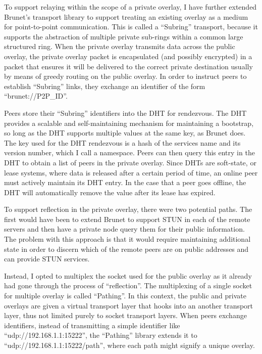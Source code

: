 To support relaying within the scope of a private overlay, I have
further extended Brunet's transport library to support treating an existing
overlay as a medium for point-to-point communication. This is called a
``Subring'' transport, because it supports the abstraction of multiple private
sub-rings within a common large structured ring.  When the private overlay
transmits data across the public overlay, the private overlay packet is
encapsulated (and possibly encrypted) in a packet that ensures it will be
delivered to the correct private destination usually by means of greedy routing
on the public overlay.  In order to instruct peers to establish ``Subring''
links, they exchange an identifier of the form ``brunet://P2P\_ID''.

Peers store their ``Subring'' identifiers into the DHT for rendezvous.
The DHT provides a scalable and self-maintaining mechanism for maintaining a
bootstrap, so long as the DHT supports multiple values at the same key, as
Brunet does.  The key used for the DHT rendezvous is a hash of the services
name and its version number, which I call a namespace.  Peers can then query
this entry in the DHT to obtain a list of peers in the private overlay.  Since
DHTs are soft-state, or lease systems, where data is released after a certain
period of time, an online peer must actively maintain its DHT entry.  In the
case that a peer goes offline, the DHT will automatically remove the value
after its lease has expired.

To support reflection in the private overlay, there were two potential paths.
The first would have been to extend Brunet to support STUN in each of the
remote servers and then have a private node query them for their public
information.  The problem with this approach is that it would require
maintaining additional state in order to discern which of the remote peers are
on public addresses and can provide STUN services.

Instead, I opted to multiplex the socket used for the public overlay as it
already had gone through the process of ``reflection''.  The multiplexing of a
single socket for multiple overlay is called ``Pathing''.  In this context, the
public and private overlays are given a virtual transport layer that hooks into
an another transport layer, thus not limited purely to socket transport layers.
When peers exchange identifiers, instead of transmitting a simple identifier
like ``udp://192.168.1.1:15222'', the ``Pathing'' library extends it to
``udp://192.168.1.1:15222/path'', where each path might signify a unique
overlay.

